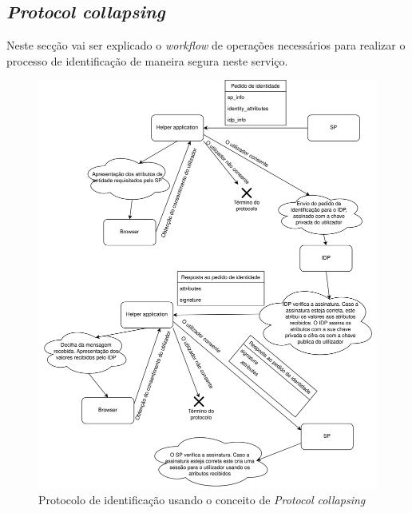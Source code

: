 \subsection{\textit{Protocol collapsing}}

\quad Neste secção vai ser explicado o \textit{workflow} de operações necessários para realizar o processo de identificação de maneira segura neste serviço.


\begin{figure}[H]
    \caption{Protocolo de identificação usando o conceito de \textit{Protocol collapsing}}
    \includegraphics[width=\textwidth]{img/protocol_identity.png}
    \centering
\end{figure}


